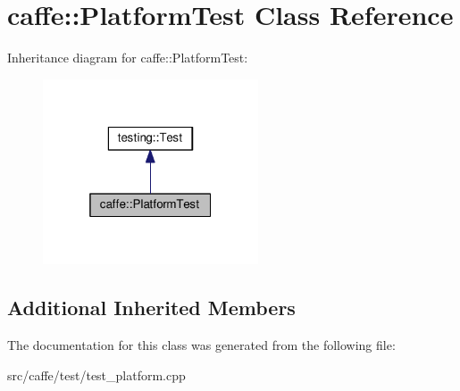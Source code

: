 \hypertarget{classcaffe_1_1_platform_test}{}\section{caffe\+:\+:Platform\+Test Class Reference}
\label{classcaffe_1_1_platform_test}


Inheritance diagram for caffe\+:\+:Platform\+Test\+:
\nopagebreak
\begin{figure}[H]
\begin{center}
\leavevmode
\includegraphics[width=181pt]{classcaffe_1_1_platform_test__inherit__graph}
\end{center}
\end{figure}
\subsection*{Additional Inherited Members}


The documentation for this class was generated from the following file\+:\begin{DoxyCompactItemize}
\item 
src/caffe/test/test\+\_\+platform.\+cpp\end{DoxyCompactItemize}
